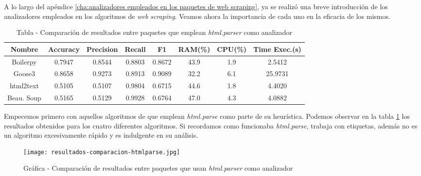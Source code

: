 A lo largo del apéndice \ref{cha:analizadores empleados en los paquetes de web scraping}, ya se realizó una 
breve introducción de los analizadores empleados en los algoritmos de \emph{web scraping}. Veamos ahora la
importancia de cada uno en la eficacia de los mismos.

\begin{table}[h]
    \begin{center}
      \begin{tabular}{| c | c | c | c | c | c | c | c |} \hline 
       \textbf{Nombre} & \textbf{Accuracy} & \textbf{Precision}  & \textbf{Recall} & \textbf{F1} & \textbf{RAM(\%)} & \textbf{CPU(\%)} & \textbf{Time Exec.(s)} \\ \hline
       Boilerpy & 0.7947 & 0.8544 & 0.8803 & 0.8672 & 43.9 & 1.9 & 2.5412 \\ \hline
       Goose3 & 0.8658 & 0.9273 & 0.8913 & 0.9089 & 32.2 & 6.1 & 25.9731 \\ \hline
       html2text & 0.5105 & 0.5107 & 0.9804 & 0.6715 & 44.6 & 1.8 & 4.4020 \\ \hline
       Beau. Soup & 0.5165 & 0.5129 & 0.9928 & 0.6764 & 47.0 & 4.3 & 4.0882 \\ \hline
      \end{tabular}
      \caption{Tabla - Comparación de resultados entre paquetes que emplean \emph{html.parser} como analizador}
      \label{tab:tabla - comparacion de resultados entre paquetes que emplean html.parser como analizador}
    \end{center}
\end{table}

Empecemos primero con aquellos algoritmos de que emplean \emph{html.parse} como parte de su heurística.
Podemos observar en la tabla \ref{tab:tabla - comparacion de resultados entre paquetes que emplean html.parser como analizador} los
resultados obtenidos para los cuatro diferentes algoritmos. Si recordamos como funcionaba \emph{html.parse},
trabaja con etiquetas, además no es un algoritmo excesivamente rápido y es indulgente en su análisis.

\begin{figure}[tphb]
    \centering
    \texttt{[image: resultados-comparacion-htmlparse.jpg]}
    \caption{Gráfica - Comparación de resultados entre paquetes que usan \emph{html.parser} como analizador}
    \label{img:grafica - comparacion de resultados entre paquetes que usan html.parser como analizador}
\end{figure}

